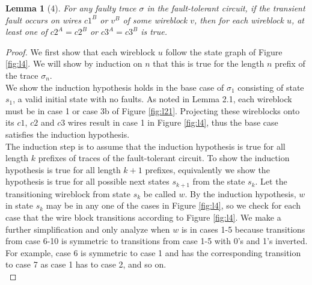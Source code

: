 \documentclass[12pt]{report}
\newtheorem*{lemma}{Lemma}
\begin{document}
\begin{lemma}[4]
For any faulty trace $\sigma$ in the fault-tolerant circuit, if the transient fault occurs on wires $c1^B$ or $v^B$ of some wireblock $v$, then for each wireblock $u$, at least one of $c2^A=c2^B$ or $c3^A=c3^B$ is true.\end{lemma}
\begin{proof}
We first show that each wireblock $u$ follow the state graph of Figure \ref{fig:l4}. 
We will show by induction on $n$ that this is true for the length $n$ prefix of the trace $\sigma_n$.\\ %

We show the induction hypothesis holds in the base case of $\sigma_1$ consisting of state $s_1$, a valid initial state with no faults. As noted in Lemma 2.1, each wireblock must be in case 1 or case 3b of Figure \ref{fig:l21}. Projecting these wireblocks onto its $c1$, $c2$ and $c3$ wires result in case 1 in Figure \ref{fig:l4}, thus the base case satisfies the induction hypothesis.\\

The induction step is to assume that the induction hypothesis is true for all length $k$ prefixes of traces of the fault-tolerant circuit. 
To show the induction hypothesis is true for all length $k+1$ prefixes, equivalently we show the hypothesis is true for all possible next states $s_{k+1}$ from the state $s_k$. Let the transitioning wireblock from state $s_k$ be called $w$. By the induction hypothesis, $w$ in state $s_k$ may be in any one of the cases in Figure \ref{fig:l4}, so we check for each case that the wire block transitions according to Figure \ref{fig:l4}. We make a further simplification and only analyze when $w$ is in cases 1-5 because transitions from case 6-10 is symmetric to transitions from case 1-5 with 0's and 1's inverted. For example, case 6 is symmetric to case 1 and has the corresponding transition to case 7 as case 1 has to case 2, and so on.\\


\end{proof}
\end{document}
